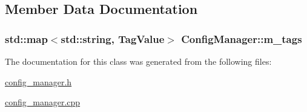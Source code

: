 \subsection{Member Data Documentation}
\hypertarget{classConfigManager_a5f856d0055899581bd138476045de013}{
\subsubsection[{m\-\_\-tags}]{\setlength{\rightskip}{0pt plus 5cm}std\-::map$<$std\-::string, {\bf Tag\-Value}$>$ Config\-Manager\-::m\-\_\-tags\hspace{0.3cm}{\ttfamily [private]}}}\label{classConfigManager_a5f856d0055899581bd138476045de013}


The documentation for this class was generated from the following files\-:\begin{DoxyCompactItemize}
\item 
\hyperlink{config__manager_8h}{config\-\_\-manager.\-h}\item 
\hyperlink{config__manager_8cpp}{config\-\_\-manager.\-cpp}\end{DoxyCompactItemize}
